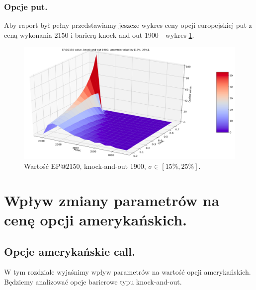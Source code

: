 \documentclass[12pt]{article}
\begin{document}
\subsubsection{Opcje put.}

Aby raport był pełny przedstawiamy jeszcze wykres ceny opcji europejskiej put z ceną wykonania 2150 i barierą knock-and-out 1900 - wykres \ref{fig:ep_2150_1900_uv}.

\begin{figure}[H]
    \centering
    \includegraphics[width=\textwidth,height=\textheight,keepaspectratio]{ep_2150_1900_uv.png}
    \caption{Wartość EP@2150, knock-and-out 1900, $\sigma \in [15\%, 25\%].$}
    \label{fig:ep_2150_1900_uv}
\end{figure}

\section{Wpływ zmiany parametrów na cenę opcji amerykańskich.}
\subsection{Opcje amerykańskie call.}

W tym rozdziale wyjaśnimy wpływ parametrów na wartość opcji amerykańskich. Będziemy analizować opcje barierowe typu knock-and-out. 
\end{document}
